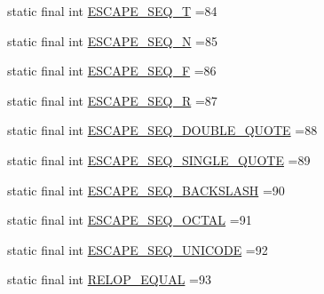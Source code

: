 \begin{DoxyCompactItemize}
\item 
static final int \hyperlink{classgov_1_1nasa_1_1jpf_1_1inspector_1_1server_1_1expression_1_1parser_1_1_expression_grammar_lexer_af72220fb0e787eac27175a4aa4663a21}{E\+S\+C\+A\+P\+E\+\_\+\+S\+E\+Q\+\_\+T} =84
\item 
static final int \hyperlink{classgov_1_1nasa_1_1jpf_1_1inspector_1_1server_1_1expression_1_1parser_1_1_expression_grammar_lexer_ae13e71b04935917781b88d551b8f5eb6}{E\+S\+C\+A\+P\+E\+\_\+\+S\+E\+Q\+\_\+N} =85
\item 
static final int \hyperlink{classgov_1_1nasa_1_1jpf_1_1inspector_1_1server_1_1expression_1_1parser_1_1_expression_grammar_lexer_a0d2894819a1ebd260bd042fa450fc293}{E\+S\+C\+A\+P\+E\+\_\+\+S\+E\+Q\+\_\+F} =86
\item 
static final int \hyperlink{classgov_1_1nasa_1_1jpf_1_1inspector_1_1server_1_1expression_1_1parser_1_1_expression_grammar_lexer_ad7a430bf730c5af530eefeafb6a32d05}{E\+S\+C\+A\+P\+E\+\_\+\+S\+E\+Q\+\_\+R} =87
\item 
static final int \hyperlink{classgov_1_1nasa_1_1jpf_1_1inspector_1_1server_1_1expression_1_1parser_1_1_expression_grammar_lexer_a31edf1b11f8baca4f1ca31bf8c8178cb}{E\+S\+C\+A\+P\+E\+\_\+\+S\+E\+Q\+\_\+\+D\+O\+U\+B\+L\+E\+\_\+\+Q\+U\+O\+TE} =88
\item 
static final int \hyperlink{classgov_1_1nasa_1_1jpf_1_1inspector_1_1server_1_1expression_1_1parser_1_1_expression_grammar_lexer_a4306f639146725b21f947786541b52f1}{E\+S\+C\+A\+P\+E\+\_\+\+S\+E\+Q\+\_\+\+S\+I\+N\+G\+L\+E\+\_\+\+Q\+U\+O\+TE} =89
\item 
static final int \hyperlink{classgov_1_1nasa_1_1jpf_1_1inspector_1_1server_1_1expression_1_1parser_1_1_expression_grammar_lexer_a5e96f4a08506b56532a0e397a0f682a5}{E\+S\+C\+A\+P\+E\+\_\+\+S\+E\+Q\+\_\+\+B\+A\+C\+K\+S\+L\+A\+SH} =90
\item 
static final int \hyperlink{classgov_1_1nasa_1_1jpf_1_1inspector_1_1server_1_1expression_1_1parser_1_1_expression_grammar_lexer_a8bf6c26ad7b861a9010747f7c9fe8244}{E\+S\+C\+A\+P\+E\+\_\+\+S\+E\+Q\+\_\+\+O\+C\+T\+AL} =91
\item 
static final int \hyperlink{classgov_1_1nasa_1_1jpf_1_1inspector_1_1server_1_1expression_1_1parser_1_1_expression_grammar_lexer_acba7525f54fe1a54673f7a689ebf04a9}{E\+S\+C\+A\+P\+E\+\_\+\+S\+E\+Q\+\_\+\+U\+N\+I\+C\+O\+DE} =92
\item 
static final int \hyperlink{classgov_1_1nasa_1_1jpf_1_1inspector_1_1server_1_1expression_1_1parser_1_1_expression_grammar_lexer_a7641aee3ad879fa2136ecdd593458a74}{R\+E\+L\+O\+P\+\_\+\+E\+Q\+U\+AL} =93

\end{DoxyCompactItemize}
